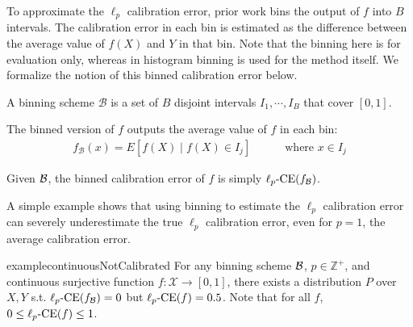 To approximate the $\ell_p$ calibration error, prior work bins the output of $f$ into $B$ intervals.
The calibration error in each bin is estimated as the difference between the average value of $f(X)$ and $Y$ in that bin.
Note that the binning here is for evaluation only, whereas in histogram binning is used for the method itself.
We formalize the notion of this binned calibration error below.

\begin{definition}
A binning scheme $\mathcal{B}$ is a set of $B$ disjoint intervals $I_1, \cdots, I_B$ that cover $[0, 1]$.
\end{definition}

\begin{definition}
The binned version of $f$ outputs the average value of $f$ in each bin:
\begin{align}
f_{\mathcal{B}}(x) = E[f(X) \mid f(X) \in I_j] \quad\quad\quad \mbox{where }x \in I_j
\end{align} 
\end{definition}

\begin{definition}
Given $\mathcal{B}{}$, the binned calibration error of $f$ is simply $\ell_p\mbox{-CE}(f_{\mathcal{B}{}})$.
\end{definition}



A simple example shows that using binning to estimate the $\ell_p$ calibration error can severely underestimate the true $\ell_p$ calibration error, even for $p=1$, the average calibration error.

\begin{restatable}{example}{continuousNotCalibrated}
\label{ex:continuous-not-calibrated}
For any binning scheme $\mathcal{B}{}$, $p \in \mathbb{Z}^+$, and continuous surjective function $f : \mathcal{X} \to [0, 1]$, there exists a distribution $P$ over $X, Y$ s.t. $\ell_p\mbox{-CE}(f_{\mathcal{B}{}}) = 0$ but $\ell_p\mbox{-CE}(f) = 0.5$.
Note that for all $f$, $0 \leq \ell_p\mbox{-CE}(f) \leq 1$.
\end{restatable}

